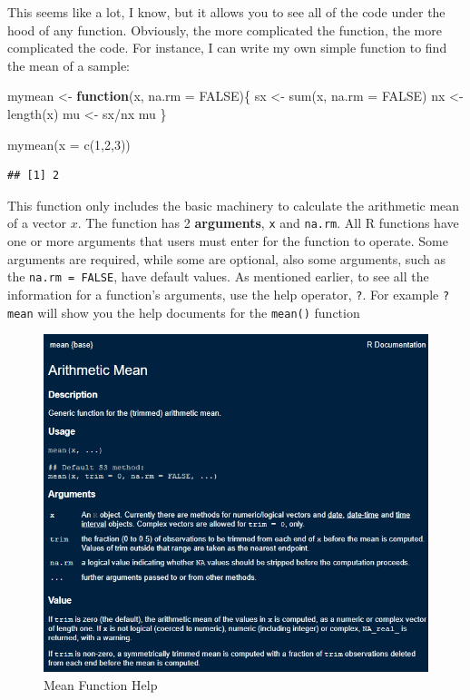 \documentclass[
]{article}
\newenvironment{Shaded}{\begin{snugshade}}{\end{snugshade}}
\newcommand{\AttributeTok}[1]{\textcolor[rgb]{0.77,0.63,0.00}{#1}}
\newcommand{\ConstantTok}[1]{\textcolor[rgb]{0.00,0.00,0.00}{#1}}
\newcommand{\ControlFlowTok}[1]{\textcolor[rgb]{0.13,0.29,0.53}{\textbf{#1}}}
\newcommand{\DecValTok}[1]{\textcolor[rgb]{0.00,0.00,0.81}{#1}}
\newcommand{\FunctionTok}[1]{\textcolor[rgb]{0.00,0.00,0.00}{#1}}
\newcommand{\NormalTok}[1]{#1}
\newcommand{\OtherTok}[1]{\textcolor[rgb]{0.56,0.35,0.01}{#1}}
\newcommand{\SpecialCharTok}[1]{\textcolor[rgb]{0.00,0.00,0.00}{#1}}
\begin{document}
This seems like a lot, I know, but it allows you to see all of the code
under the hood of any function. Obviously, the more complicated the
function, the more complicated the code. For instance, I can write my
own simple function to find the mean of a sample:

\begin{Shaded}
\begin{Highlighting}[]
\NormalTok{mymean }\OtherTok{\textless{}{-}} \ControlFlowTok{function}\NormalTok{(x,}
                   \AttributeTok{na.rm =} \ConstantTok{FALSE}\NormalTok{)\{}
\NormalTok{  sx }\OtherTok{\textless{}{-}} \FunctionTok{sum}\NormalTok{(x, }
            \AttributeTok{na.rm =} \ConstantTok{FALSE}\NormalTok{)}
\NormalTok{  nx }\OtherTok{\textless{}{-}} \FunctionTok{length}\NormalTok{(x)}
\NormalTok{  mu }\OtherTok{\textless{}{-}}\NormalTok{ sx}\SpecialCharTok{/}\NormalTok{nx}
\NormalTok{  mu}
\NormalTok{\}}

\FunctionTok{mymean}\NormalTok{(}\AttributeTok{x =} \FunctionTok{c}\NormalTok{(}\DecValTok{1}\NormalTok{,}\DecValTok{2}\NormalTok{,}\DecValTok{3}\NormalTok{))}
\end{Highlighting}
\end{Shaded}

\begin{verbatim}
## [1] 2
\end{verbatim}

This function only includes the basic machinery to calculate the
arithmetic mean of a vector \(x\). The function has 2 \textbf{arguments}, \texttt{x}
and \texttt{na.rm}. All R functions have one or more arguments that users must
enter for the function to operate. Some arguments are required, while
some are optional, also some arguments, such as the \texttt{na.rm\ =\ FALSE},
have default values. As mentioned earlier, to see all the information
for a function's arguments, use the help operator, \texttt{?}. For example
\texttt{?mean} will show you the help documents for the \texttt{mean()} function

\begin{figure}
\centering
\includegraphics{images/meandoc.png}
\caption{Mean Function Help}
\end{figure}
\end{document}
